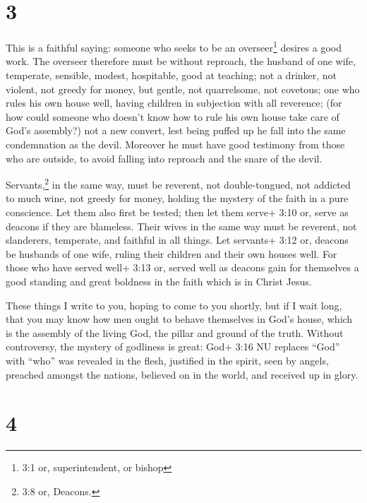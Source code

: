 \hypertarget{section-2}{%
\section{3}\label{section-2}}

 This is a faithful saying: someone who seeks to be an
overseer\footnote{3:1 or, superintendent, or bishop} desires a good
work.  The overseer therefore must be without reproach, the
husband of one wife, temperate, sensible, modest, hospitable, good at
teaching;  not a drinker, not violent, not greedy for money,
but gentle, not quarrelsome, not covetous;  one who rules
his own house well, having children in subjection with all reverence;
 (for how could someone who doesn't know how to rule his own
house take care of God's assembly?)  not a new convert, lest
being puffed up he fall into the same condemnation as the devil.
 Moreover he must have good testimony from those who are
outside, to avoid falling into reproach and the snare of the devil.

 Servants,\footnote{3:8 or, Deacons.} in the same way, must
be reverent, not double-tongued, not addicted to much wine, not greedy
for money,  holding the mystery of the faith in a pure
conscience.  Let them also first be tested; then let them
serve+ 3:10 or, serve as deacons if they are blameless. 
Their wives in the same way must be reverent, not slanderers, temperate,
and faithful in all things.  Let servants+ 3:12 or, deacons
be husbands of one wife, ruling their children and their own houses
well.  For those who have served well+ 3:13 or, served well
as deacons gain for themselves a good standing and great boldness in the
faith which is in Christ Jesus.

 These things I write to you, hoping to come to you
shortly,  but if I wait long, that you may know how men
ought to behave themselves in God's house, which is the assembly of the
living God, the pillar and ground of the truth.  Without
controversy, the mystery of godliness is great: God+ 3:16 NU replaces
``God'' with ``who'' was revealed in the flesh, justified in the spirit,
seen by angels, preached amongst the nations, believed on in the world,
and received up in glory.

\hypertarget{section-3}{%
\section{4}\label{section-3}}

